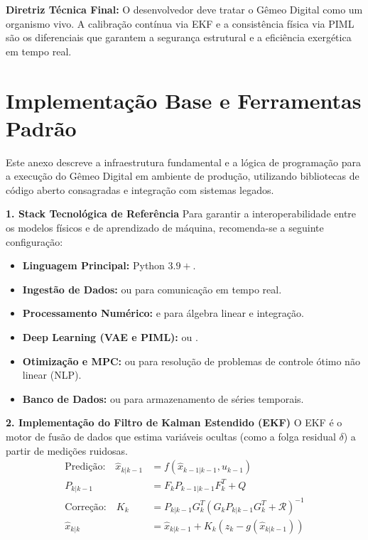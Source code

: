 \documentclass[12pt,a4paper]{article}
\numberwithin{equation}{section}
\numberwithin{table}{section}
\numberwithin{figure}{section}
\begin{document}
	\textbf{Diretriz Técnica Final:} O desenvolvedor deve tratar o Gêmeo Digital como um organismo vivo. A calibração contínua via EKF e a consistência física via PIML são os diferenciais que garantem a segurança estrutural e a eficiência exergética em tempo real.
	
	\newpage
	\appendix
	\renewcommand{\thesection}{\Alph{section}}
	
	\section{Implementação Base e Ferramentas Padrão}
	
	Este anexo descreve a infraestrutura fundamental e a lógica de programação para a execução do Gêmeo Digital em ambiente de produção, utilizando bibliotecas de código aberto consagradas e integração com sistemas legados.
	
	\textbf{1. Stack Tecnológica de Referência}
	Para garantir a interoperabilidade entre os modelos físicos e de aprendizado de máquina, recomenda-se a seguinte configuração:
	\begin{itemize}
		\item \textbf{Linguagem Principal:} Python $3.9+$.
		\item \textbf{Ingestão de Dados:}  ou  para comunicação em tempo real.
		\item \textbf{Processamento Numérico:}  e  para álgebra linear e integração.
		\item \textbf{Deep Learning (VAE e PIML):}  ou .
		\item \textbf{Otimização e MPC:}  ou  para resolução de problemas de controle ótimo não linear (NLP).
		\item \textbf{Banco de Dados:}  ou  para armazenamento de séries temporais.
	\end{itemize}
	
	\textbf{2. Implementação do Filtro de Kalman Estendido (EKF)}
	O EKF é o motor de fusão de dados que estima variáveis ocultas (como a folga residual $\delta$) a partir de medições ruidosas.
	\begin{equation}\label{eq:s26-1}
	\begin{aligned}
		\text{Predição:} \quad \hat{x}_{k|k-1} &= f(\hat{x}_{k-1|k-1}, u_{k-1}) \\[4pt]
		P_{k|k-1} &= F_k P_{k-1|k-1} F_k^T + Q \\[8pt]
		\text{Correção:} \quad K_k &= P_{k|k-1} G_k^T (G_k P_{k|k-1} G_k^T + \mathcal{R})^{-1} \\[4pt]
		\hat{x}_{k|k} &= \hat{x}_{k|k-1} + K_k (z_k - g(\hat{x}_{k|k-1}))
	\end{aligned}
\end{equation}
	
\end{document}
